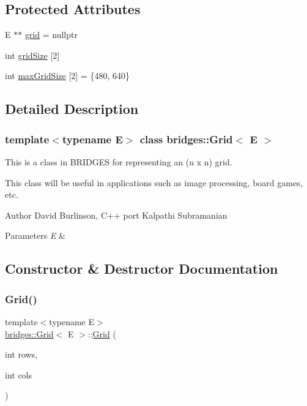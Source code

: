 \subsection*{Protected Attributes}
\begin{DoxyCompactItemize}
\item 
E $\ast$$\ast$ \mbox{\hyperlink{classbridges_1_1_grid_aea6c38498d477f09dc03906ee6fb6e19}{grid}} = nullptr
\item 
int \mbox{\hyperlink{classbridges_1_1_grid_af7c3a077b54e3346621e54276c1fa13e}{grid\+Size}} \mbox{[}2\mbox{]}
\item 
int \mbox{\hyperlink{classbridges_1_1_grid_a800909a94e0affac82da79cf3e6d03e5}{max\+Grid\+Size}} \mbox{[}2\mbox{]} = \{480, 640\}
\end{DoxyCompactItemize}


\subsection{Detailed Description}
\subsubsection*{template$<$typename E$>$\newline
class bridges\+::\+Grid$<$ E $>$}

This is a class in B\+R\+I\+D\+G\+ES for representing an (n x n) grid. 

This class will be useful in applications such as image processing, board games, etc.

\begin{DoxyAuthor}{Author}
David Burlinson, C++ port Kalpathi Subramanian
\end{DoxyAuthor}

\begin{DoxyParams}{Parameters}
{\em E} & \\
\hline
\end{DoxyParams}


\subsection{Constructor \& Destructor Documentation}
\mbox{\label{classbridges_1_1_grid_af8bb9244c4c713f2325af6d4754ad1e9}} 
\subsubsection{\texorpdfstring{Grid()}{Grid()}\hspace{0.1cm}{\footnotesize\ttfamily [1/4]}}
{\footnotesize\ttfamily template$<$typename E$>$ \\
\mbox{\hyperlink{classbridges_1_1_grid}{bridges\+::\+Grid}}$<$ E $>$\+::\mbox{\hyperlink{classbridges_1_1_grid}{Grid}} (\begin{DoxyParamCaption}\item[{int}]{rows,  }\item[{int}]{cols }\end{DoxyParamCaption})\hspace{0.3cm}{\ttfamily [inline]}}

